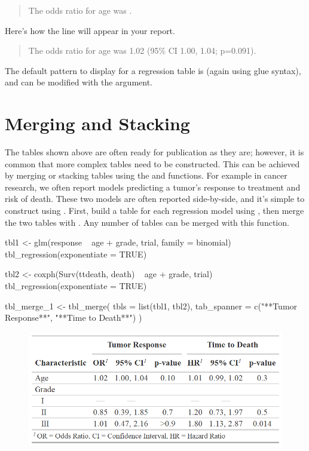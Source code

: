 \begin{quote}
The odds ratio for age was .
\end{quote}

Here's how the line will appear in your report.

\begin{quote}
The odds ratio for age was 1.02 (95\% CI 1.00, 1.04; p=0.091).
\end{quote}

The default pattern to display for a regression table is  (again using glue syntax), and can be modified with the  argument. 

\section{Merging and Stacking}

The  tables shown above are often ready for publication as they are; however, it is common that more complex tables need to be constructed. This can be achieved by merging or stacking  tables using the  and  functions.
For example in cancer research, we often report models predicting a tumor's response to treatment and risk of death.
These two models are often reported side-by-side, and it's simple to construct using .
First, build a table for each regression model using , then merge the two tables with .
Any number of  tables can be merged with this function.

\begin{example}
tbl1 <- 
  glm(response ~ age + grade, trial, family = binomial) %
  tbl_regression(exponentiate = TRUE)

tbl2 <-
  coxph(Surv(ttdeath, death) ~ age + grade, trial) %
  tbl_regression(exponentiate = TRUE) 

tbl_merge_1 <-
  tbl_merge(
    tbls = list(tbl1, tbl2),
    tab_spanner = c("**Tumor Response**", "**Time to Death**")
  )
\end{example}
\newpage

\begin{figure}[h!]
  \includegraphics[scale=0.49]{merge.png}
  \centering
\end{figure}

